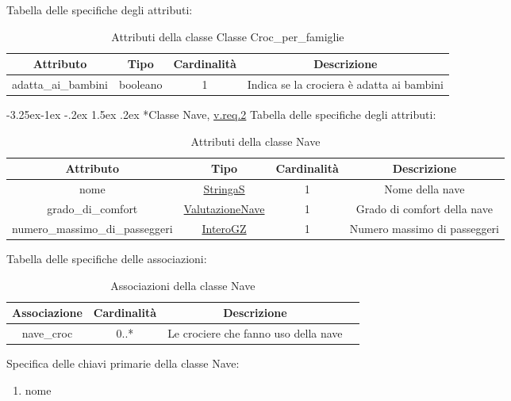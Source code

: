 \documentclass{article}
\makeatletter
\renewcommand\subsection{\@startsection{subsection}{2}{\z@}%
                                     {-3.25ex\@plus -1ex \@minus -.2ex}%
                                     {1.5ex \@plus .2ex}%
                                     {\normalfont\normalsize\bfseries}}
\makeatother
\begin{document}
Tabella delle specifiche degli attributi:
\begin{table}[h!]
    \centering
    \begin{tabular}{|c|c|c|c|}
        \hline
        Attributo & Tipo & Cardinalità & Descrizione \\
        \hline
        adatta\_ai\_bambini & booleano & 1 & Indica se la crociera è adatta ai bambini \\
        \hline
    \end{tabular}
    \caption{Attributi della classe Classe Croc\_per\_famiglie}
\end{table}

\newpage
\subsection*{Classe Nave, \hyperref[sec:RequisitiNave]{v.req.2}}\label{sec:Nave}
Tabella delle specifiche degli attributi:
\begin{table}[h!]
    \centering
    \begin{tabular}{|c|c|c|c|}
        \hline
        Attributo & Tipo & Cardinalità & Descrizione \\
        \hline
        nome & \hyperref[sec:StringaS]{StringaS} & 1 & Nome della nave \\
        grado\_di\_comfort & \hyperref[sec:ValutazioneNave]{ValutazioneNave} & 1 & Grado di comfort della nave \\
        numero\_massimo\_di\_passeggeri & \hyperref[sec:InteroGZ]{InteroGZ} & 1 & Numero massimo di passeggeri \\
        \hline
    \end{tabular}
    \caption{Attributi della classe Nave}
\end{table}

Tabella delle specifiche delle associazioni:
\begin{table}[h!]
    \centering
    \begin{tabular}{|c|c|c|c|}
        \hline
        Associazione & Cardinalità & Descrizione \\
        \hline
        nave\_croc & 0..* & Le crociere che fanno uso della nave \\
        \hline
    \end{tabular}
    \caption{Associazioni della classe Nave}
\end{table}

Specifica delle chiavi primarie della classe Nave:
\begin{enumerate}
    \item nome
\end{enumerate}
\end{document}

